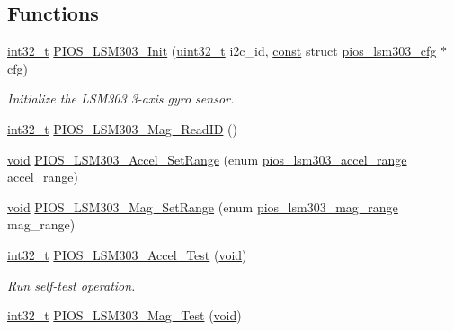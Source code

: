 \subsection*{Functions}
\begin{DoxyCompactItemize}
\item 
\hyperlink{group___n_a_m_e_gafd12020da5a235dfcf0c3c748fb5baed}{int32\-\_\-t} \hyperlink{group___p_i_o_s___l_s_m303_ga14f9c78fed7bf58de8e69e585cd67769}{P\-I\-O\-S\-\_\-\-L\-S\-M303\-\_\-\-Init} (\hyperlink{stdint_8h_a435d1572bf3f880d55459d9805097f62}{uint32\-\_\-t} i2c\-\_\-id, \hyperlink{group___n_a_m_e_ga7ae6d0e43244213b34de2c2b9aa30da6}{const} struct \hyperlink{structpios__lsm303__cfg}{pios\-\_\-lsm303\-\_\-cfg} $\ast$cfg)
\begin{DoxyCompactList}\small\item\em Initialize the L\-S\-M303 3-\/axis gyro sensor. \end{DoxyCompactList}\item 
\hyperlink{group___n_a_m_e_gafd12020da5a235dfcf0c3c748fb5baed}{int32\-\_\-t} \hyperlink{group___p_i_o_s___l_s_m303_gae7f600d0c2cfc85affb21312eef1b4ce}{P\-I\-O\-S\-\_\-\-L\-S\-M303\-\_\-\-Mag\-\_\-\-Read\-I\-D} ()
\item 
\hyperlink{group___n_a_m_e_ga18028b8badbf1ea7e704ccac3c488e82}{void} \hyperlink{group___p_i_o_s___l_s_m303_ga8b8011cf8463e2ae40eae82b2bf78251}{P\-I\-O\-S\-\_\-\-L\-S\-M303\-\_\-\-Accel\-\_\-\-Set\-Range} (enum \hyperlink{group___p_i_o_s___l_s_m303_gafbb0e59427f40a8d9b0e901af02bb7b3}{pios\-\_\-lsm303\-\_\-accel\-\_\-range} accel\-\_\-range)
\item 
\hyperlink{group___n_a_m_e_ga18028b8badbf1ea7e704ccac3c488e82}{void} \hyperlink{group___p_i_o_s___l_s_m303_gae1c05338828d7ced47c189ed3e73a24a}{P\-I\-O\-S\-\_\-\-L\-S\-M303\-\_\-\-Mag\-\_\-\-Set\-Range} (enum \hyperlink{group___p_i_o_s___l_s_m303_ga24737af5b503329ca628b921e32ec8d8}{pios\-\_\-lsm303\-\_\-mag\-\_\-range} mag\-\_\-range)
\item 
\hyperlink{group___n_a_m_e_gafd12020da5a235dfcf0c3c748fb5baed}{int32\-\_\-t} \hyperlink{group___p_i_o_s___l_s_m303_ga6cead4a99372061bc1b1a9a08a0eb183}{P\-I\-O\-S\-\_\-\-L\-S\-M303\-\_\-\-Accel\-\_\-\-Test} (\hyperlink{group___n_a_m_e_ga18028b8badbf1ea7e704ccac3c488e82}{void})
\begin{DoxyCompactList}\small\item\em Run self-\/test operation. \end{DoxyCompactList}\item 
\hyperlink{group___n_a_m_e_gafd12020da5a235dfcf0c3c748fb5baed}{int32\-\_\-t} \hyperlink{group___p_i_o_s___l_s_m303_ga02c4d8ca4981e2ced505a7ea3bd13a72}{P\-I\-O\-S\-\_\-\-L\-S\-M303\-\_\-\-Mag\-\_\-\-Test} (\hyperlink{group___n_a_m_e_ga18028b8badbf1ea7e704ccac3c488e82}{void})

\end{DoxyCompactItemize}
